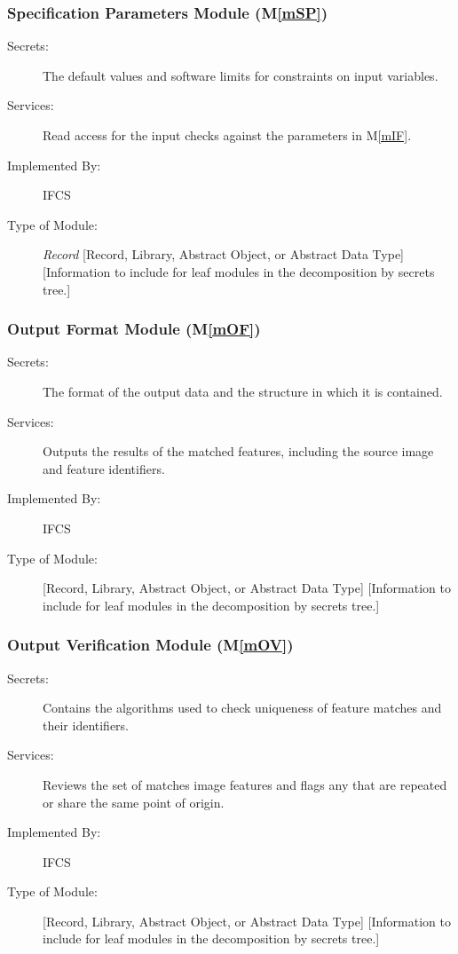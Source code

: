 \documentclass[12pt, titlepage]{article}
\newcommand{\mref}[1]{M\ref{#1}}
\begin{document}
\subsubsection{Specification Parameters Module (\mref{mSP})}

\begin{description}
\item[Secrets:] The default values and software limits for constraints on input 
variables.
\item[Services:]Read access for the input checks against the parameters in 
\mref{mIF}.
\item[Implemented By:] IFCS
\item[Type of Module:] \emph{Record} [Record, Library, Abstract Object, or Abstract Data Type]
  [Information to include for leaf modules in the decomposition by secrets tree.]
\end{description}

\subsubsection{Output Format Module (\mref{mOF})}

\begin{description}
\item[Secrets:]The format of the output data and the structure in which it is contained.
\item[Services:]Outputs the results of the matched features, including the source image and 
feature identifiers.
\item[Implemented By:] IFCS
\item[Type of Module:] [Record, Library, Abstract Object, or Abstract Data Type]
  [Information to include for leaf modules in the decomposition by secrets tree.]
\end{description}

\subsubsection{Output Verification Module (\mref{mOV})}

\begin{description}
\item[Secrets:]Contains the algorithms used to check uniqueness of feature matches and their 
identifiers.
\item[Services:]Reviews the set of matches image features and flags any that are repeated 
or share the same point of origin.
\item[Implemented By:] IFCS
\item[Type of Module:] [Record, Library, Abstract Object, or Abstract Data Type]
  [Information to include for leaf modules in the decomposition by secrets tree.]
\end{description}
\end{document}
